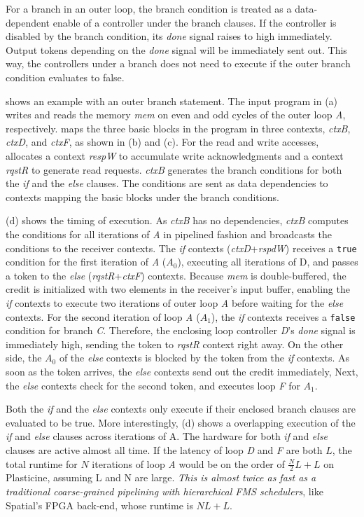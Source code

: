 For a branch in an outer loop,
the branch condition is treated as a data-dependent enable of a controller under the branch clauses.
If the controller is disabled by the branch condition, its \emph{done} signal raises to high immediately.
Output tokens depending on the {\em done} signal will be immediately sent out.
This way, the controllers under a branch does not need to execute if the outer branch condition
evaluates to false.

 shows an example with an outer branch statement.
The input program in (a) writes and reads the memory \emph{mem} on even and odd cycles of
the outer loop \emph{A}, respectively. 
\name maps the three basic blocks in the program in three
contexts, \emph{ctxB}, \emph{ctxD}, and \emph{ctxF}, as shown in (b) and (c). 
For the read and write accesses, \name
allocates a context \emph{respW} to accumulate write acknowledgments and a context \emph{rqstR} 
to generate read requests. 
\emph{ctxB} generates the branch conditions for both the \emph{if} and the \emph{else} clauses.
The conditions are sent as data dependencies to contexts mapping the basic blocks under the branch conditions.

 (d) shows the timing of execution.
As \emph{ctxB} has no dependencies, \emph{ctxB} computes the conditions for all iterations of
\emph{A} in
pipelined fashion and broadcasts the conditions to the receiver contexts.
The \emph{if} contexts (\emph{ctxD}+\emph{rspdW}) receives a \texttt{true} condition for the first
iteration of \emph{A} ($A_0$), 
executing all iterations of D, and passes a token to the \emph{else} (\emph{rqstR}+\emph{ctxF}) contexts.
Because \emph{mem} is double-buffered, the credit is initialized with two elements in the
receiver's input buffer, enabling the \emph{if} contexts to execute two iterations of outer loop
\emph{A} before
waiting for the \emph{else} contexts. For the second iteration of loop \emph{A} ($A_1$), the \emph{if} contexts
receives a \texttt{false} condition for branch \emph{C}.
Therefore, the enclosing loop controller \emph{D}'s \emph{done} signal is immediately high, sending the
token to \emph{rqstR} context right away.
On the other side, the $A_0$ of the \emph{else} contexts is blocked by the token from
the \emph{if} contexts. 
As soon as the token arrives, the \emph{else} contexts send out the credit immediately,
Next, the \emph{else} contexts check for the second token, 
and executes loop \emph{F} for $A_1$.

Both the \emph{if} and the \emph{else} contexts only execute if their enclosed branch clauses are
evaluated to be true. More interestingly,  (d) shows a overlapping execution of the
\emph{if} and \emph{else} clauses across iterations of A. 
The hardware for both \emph{if} and \emph{else} clauses are active almost all time.
If the latency of loop \emph{D} and \emph{F} are both $L$, 
the total runtime for $N$ iterations of loop \emph{A} would be on the order of $\frac{N}{2}L+L$
on Plasticine, assuming L and N are large.
\emph{This is almost twice as fast as a traditional coarse-grained pipelining with hierarchical FMS
schedulers}, like Spatial's FPGA back-end, whose runtime is $NL+L$.

